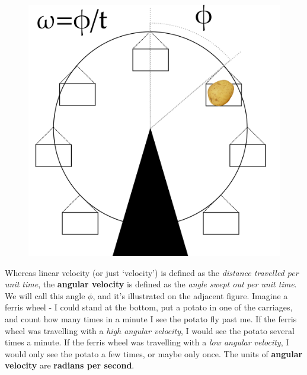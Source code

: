 \documentclass{memoir}[11pt,oneside,a4paper,openany]
\begin{document}
\begin{figure}
	\centering
	\includegraphics[width=0.9\linewidth]{angular_velocity.png}
\end{figure}
Whereas linear velocity (or just `velocity') is defined as the \emph{distance travelled per unit time}, the \textbf{angular velocity} is defined as the \emph{angle swept out per unit time}. We will call this angle $\phi$, and it's illustrated on the adjacent figure. Imagine a ferris wheel - I could stand at the bottom, put a potato in one of the carriages, and count how many times in a minute I see the potato fly past me. If the ferris wheel was travelling with a \emph{high angular velocity}, I would see the potato several times a minute. If the ferris wheel was travelling with a \emph{low angular velocity}, I would only see the potato a few times, or maybe only once. The units of \textbf{angular velocity} are \textbf{radians per second}. 
\end{document}
